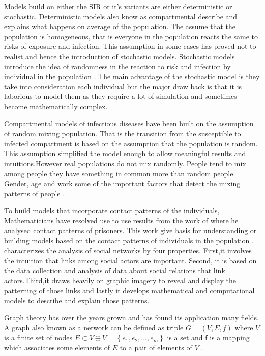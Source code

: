 Models build on either the SIR or it's variants are either deterministic or stochastic. Deterministic models also know as compartmental describe and explains what happens on average of the population. The assume that the population is homogeneous, that is everyone in the population reacts the same to risks of exposure and infection. This assumption in some cases has proved not to realist and hence the introduction of stochastic models. Stochastic models introduce the idea of randomness in the reaction to risk and infection by individual in the population \citep{ming2016stochastic}. The main advantage of the stochastic model is they take into consideration each individual but the major draw back is that it is laborious to model them as they require a lot of simulation and sometimes become mathematically complex.


Compartmental models of infectious diseases have been built on the assumption of random mixing population. That is the transition from the susceptible to infected compartment is based on the assumption that the population is random. This assumption simplified the model enough to allow meaningful results and intuitions.However real populations do not mix randomly. People tend to mix among people they have something in common more than random people. Gender, age and work some of the important factors that detect the mixing patterns of people \citep{sat}.
 
To build models that incorporate contact patterns of the individuals, Mathematicians have resolved use to use results from the work of \cite{moreno1945application} where he analysed contact patterns of prisoners. This work give basis for understanding or building models based on the contact patterns of individuals in the population \citep{sat}. \cite{freeman2004development} characterizes the analysis of social networks by four properties. First,it involves the intuition
 that links among social actors 
are important. Second, it is based on the data collection and analysis of data about social relations that link actors.Third,it draws heavily on graphic imagery to reveal and display the patterning of those links and lastly it develops mathematical and computational models to describe and explain those patterns. 

Graph theory has over the years grown and has found its application many fields. A graph also known as a network   can be  defined as triple $G = (V,E,f)$ where $V$ is a finite set of nodes $E \subset V \oplus V = \left\lbrace e_1,e_2,\dots ,e_m \right\rbrace$ is a set and f is a mapping which associates some elements of $E$ to a pair of elements of $V$ \citep{estrada2012structure}. 

